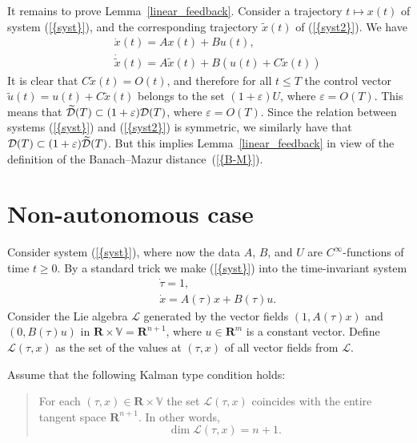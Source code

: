 \documentclass[final]{siamltex}
\begin{document}
It remains to prove Lemma~\ref{linear_feedback}. Consider a trajectory $t\mapsto x(t)$ of system
{(\ref{{syst}})}, and the corresponding trajectory $\widetilde x(t)$ of {(\ref{{syst2}})}. We have
\begin{eqnarray}&&\dot x(t)=A x(t)+Bu(t),\nonumber\\
&&\dot{\widetilde x}(t)=A{\widetilde x}(t)+B(u(t)+C{\widetilde x}(t))\nonumber\end{eqnarray} It is
clear that $C{\widetilde x}(t)=O(t)$, and therefore for all $t\leq T$ the control vector $\widetilde
u(t)=u(t)+C{\widetilde x}(t)$  belongs to the set $(1+\varepsilon)U$, where $\varepsilon=O(T)$. This
means that $\widetilde{\cal D} (T)\subset (1+\varepsilon){\cal D} (T)$, where $\varepsilon=O(T)$.
Since the relation between systems {(\ref{{syst}})} and {(\ref{{syst2}})} is symmetric, we similarly have
that ${\cal D} (T)\subset (1+\varepsilon)\widetilde{\cal D} (T)$. But this implies
Lemma~\ref{linear_feedback} in view of the definition of the Banach--Mazur distance~{(\ref{{B-M}})}.

\fi

\section{Non-autonomous case} \iffalse In fact, the same phenomenon of the existence of a limit shape takes place
in the non-autonomous case. We should just assume a kind of genericity
condition generalizing the Kalman one we operated with in the time-invariant
case. \fi

Consider system {(\ref{{syst}})}, where now the data $A$, $B$, and $U$ are
$C^\infty$-functions of  time $t\geq0$. By a standard trick we make
{(\ref{{syst}})} into the time-invariant system
\begin{eqnarray*}\label{timeinv}
&&\dot\tau=1,\\ &&\dot x={ A(\tau)}x+{ B(\tau)}u.
\end{eqnarray*}
Consider the Lie algebra ${\mathcal L}$ generated by the vector fields $\left(
1,
  { A(\tau)}x \right)$ and $\left( 0,
  { B(\tau)}u \right)$ in ${{\mathbf R}}\times\mathbb{V}={{\mathbf R}}^{n+1}$, where $u\in{{\mathbf R}}^m$ is a constant vector. Define
  ${\mathcal L}(\tau,x)$ as the set of the values at $(\tau,x)$ of all vector fields from ${\mathcal L}$.

Assume that the following Kalman type condition holds:
\begin{quote}
For each $(\tau,x)\in{{\mathbf R}}\times\mathbb{V}$ the set ${\mathcal L}(\tau,x)$ coincides with the entire
tangent space ${{\mathbf R}}^{n+1}$. In other words,
\begin{equation}\label{ext_kalman}
\dim{\mathcal L}(\tau,x)=n+1.
\end{equation}
\end{quote}
\iffalse In the time-invariant case this assumption coincides with the Kalman
controllability condition. \fi
\end{document}
